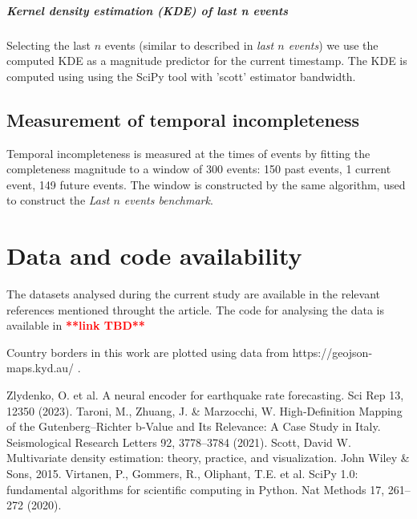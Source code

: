 \documentclass[pdflatex]{sn-jnl}
\begin{document}
\subparagraph{Kernel density estimation (KDE) of last n events} Selecting the last $n$ events (similar to described in \textit{last $n$ events}) we use the computed KDE as a magnitude predictor for the current timestamp. The KDE is computed using using the SciPy tool\cite{scipy_2020} with 'scott' estimator bandwidth\cite{scott_2015}.

\subsection{Measurement of temporal incompleteness}
Temporal incompleteness is measured at the times of events by fitting the completeness magnitude to a window of 300 events: 150 past events, 1 current event, 149 future events. The window is constructed by the same algorithm, used to construct the \textit{Last $n$ events benchmark}.




\section*{Data and code availability}
The datasets analysed during the current study are available in the relevant references mentioned throught the article.
The code for analysing the data is available in \textcolor{red}{\textbf{**link TBD**}}

Country borders in this work are plotted using data from https://geojson-maps.kyd.au/ .

\newpage
\renewcommand\refname{Methods References}
\begin{thebibliography}{10}
Zlydenko, O. et al. A neural encoder for earthquake rate forecasting. Sci Rep 13, 12350 (2023).
Taroni, M., Zhuang, J. \& Marzocchi, W. High‐Definition Mapping of the Gutenberg–Richter b‐Value and Its Relevance: A Case Study in Italy. Seismological Research Letters 92, 3778–3784 (2021).
Scott, David W. Multivariate density estimation: theory, practice, and visualization. John Wiley \& Sons, 2015.  
Virtanen, P., Gommers, R., Oliphant, T.E. et al. SciPy 1.0: fundamental algorithms for scientific computing in Python. Nat Methods 17, 261–272 (2020).





\end{thebibliography}
\end{document}
